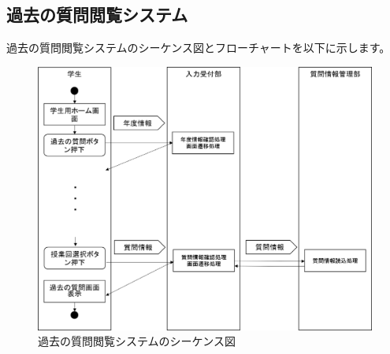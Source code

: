\newpage
\subsection{過去の質問閲覧システム}
過去の質問閲覧システムのシーケンス図とフローチャートを以下に示します。

\begin{figure}[htbp]
  \begin{center}
    \includegraphics[width=1\linewidth,clip]{./img/q_read_old/main.png}
    \caption{過去の質問閲覧システムのシーケンス図}\label{fig:qreadoldseaquence}
  \end{center}
\end{figure}

